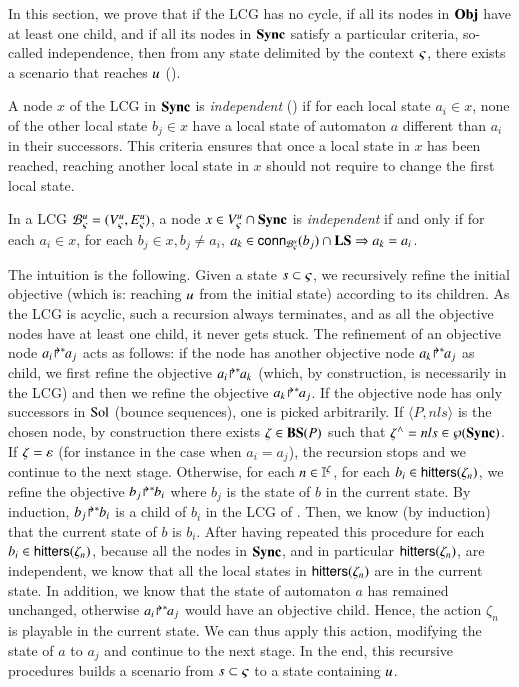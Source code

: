 In this section, we prove that if the LCG has no cycle, if all its nodes in $\mathbf{Obj}$ have at least one
child, and if all its nodes in $\mathbf{Sync}$ satisfy a
particular criteria, so-called independence, then from any state
delimited by the context $\varsigma$, there exists a scenario that reaches $u$
().

A node $x$ of the LCG in $\mathbf{Sync}$ is \emph{independent} () if for each local state
$a_i\in x$, none of the other local state $b_j\in x$ have a local state of automaton $a$ different
than $a_i$ in their successors.
This criteria ensures that once a local state in $x$ has been reached, reaching another local state
in $x$ should not require to change the first local state.

\begin{definition}
\label{def:coherent}
  In a LCG ${\mathcal{B}_{\varsigma}^{u}} = ({V_\varsigma^u}, {E_\varsigma^u})$,
  a node $x \in {V_\varsigma^u}\cap\mathbf{Sync}$ is \emph{independent} if and only if
  for each $a_i\in x$,
  for each $b_j\in x, b_j\neq a_i$,
  $a_k \in\mathsf{conn}_{{\mathcal{B}_{\varsigma}^{u}}}(b_j) \cap \mathbf{LS} \Rightarrow a_k = a_i$.
\end{definition}

The intuition is the following.
Given a state $s\subset\varsigma$, we recursively refine the initial objective
(which is: reaching $u$ from the initial state) according to its children.
As the LCG is acyclic, such a recursion always terminates, and as all the objective nodes have at
least one child, it never gets stuck.
The refinement of an objective node ${a_i\!\Rsh^*\!\!a_j}$ acts as follows:
if the node has another objective node ${a_k\!\Rsh^*\!\!a_j}$ as child, we first refine the objective
${a_i\!\Rsh^*\!\!a_k}$ (which, by construction, is necessarily in the LCG)
and then we refine the objective ${a_k\!\Rsh^*\!\!a_j}$.
If the objective node has only successors in $\mathrm{Sol}$ (bounce sequences), one is picked arbitrarily.
If $\langle P, nls\rangle$ is the chosen node,
by construction there exists $\zeta\in\mathbf{BS}(P)$ such that $\zeta^\wedge = nls \in \wp(\mathbf{Sync})$.
If $\zeta = \varepsilon$ (for instance in the case when $a_i = a_j$), the recursion stops and we
continue to the next stage.
Otherwise, for each $n\in\mathbb{I}^{\zeta}$,
for each $b_i \in\mathsf{hitters}(\zeta_n)$,
we refine the objective ${b_j\!\Rsh^*\!\!b_i}$ where $b_j$ is the state of $b$ in the current state.
By induction, ${b_j\!\Rsh^*\!\!b_i}$ is a child of $b_i$ in the LCG of .
Then, we know (by induction) that the current state of $b$ is $b_i$.
After having repeated this procedure for each $b_i\in\mathsf{hitters}(\zeta_n)$,
because all the nodes in $\mathbf{Sync}$, and in particular $\mathsf{hitters}(\zeta_n)$, are independent,
we know that all the local states in $\mathsf{hitters}(\zeta_n)$ are in the current state.
In addition, we know that the state of automaton $a$ has remained unchanged, otherwise
${a_i\!\Rsh^*\!\!a_j}$ would have an objective child.
Hence, the action $\zeta_n$ is playable in the current state.
We can thus apply this action, modifying the state of $a$ to $a_j$ and continue to the next stage.
In the end, this recursive procedures builds a scenario from $s\subset\varsigma$ to a state containing $u$.

